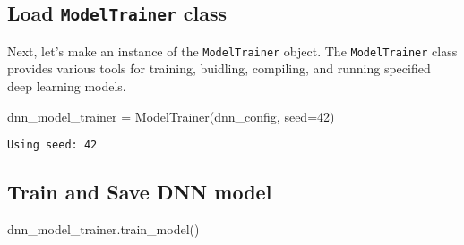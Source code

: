 \documentclass[
  letterpaper,
  DIV=11,
  numbers=noendperiod]{scrreprt}
\newenvironment{Shaded}{\begin{snugshade}}{\end{snugshade}}
\newcommand{\DecValTok}[1]{\textcolor[rgb]{0.68,0.00,0.00}{#1}}
\newcommand{\NormalTok}[1]{\textcolor[rgb]{0.00,0.23,0.31}{#1}}
\newcommand{\OperatorTok}[1]{\textcolor[rgb]{0.37,0.37,0.37}{#1}}
\begin{document}
\subsection{\texorpdfstring{Load \texttt{ModelTrainer}
class}{Load ModelTrainer class}}\label{load-modeltrainer-class-1}

Next, let's make an instance of the \texttt{ModelTrainer} object. The
\texttt{ModelTrainer} class provides various tools for training,
buidling, compiling, and running specified deep learning models.

\begin{Shaded}
\begin{Highlighting}[]
\NormalTok{dnn\_model\_trainer }\OperatorTok{=}\NormalTok{ ModelTrainer(dnn\_config, seed}\OperatorTok{=}\DecValTok{42}\NormalTok{)}
\end{Highlighting}
\end{Shaded}

\begin{verbatim}
Using seed: 42
\end{verbatim}

\subsection{Train and Save DNN model}\label{train-and-save-dnn-model}

\begin{Shaded}
\begin{Highlighting}[]
\NormalTok{dnn\_model\_trainer.train\_model()}
\end{Highlighting}
\end{Shaded}
\end{document}
